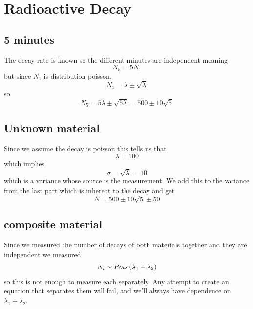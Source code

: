 \clearpage
\section{Radioactive Decay}
\subsection{5 minutes}
The decay rate is known so the different minutes are independent meaning
\begin{equation}
    N_5=5N_1
\end{equation}
but since \(N_1\) is distribution poisson,
\begin{equation}
    N_1=\lambda\pm\sqrt{\lambda}
\end{equation}
so 
\begin{equation}
    N_5 = 5\lambda\pm\sqrt{5\lambda}=500\pm10\sqrt{5}
\end{equation}
\subsection{Unknown material}
Since we assume the decay is poisson this tells us that 
\begin{equation}
    \lambda=100
\end{equation}
which implies 
\begin{equation}
    \sigma = \sqrt{\lambda}=10
\end{equation}
which is a variance whose source is the measurement. We add this to the variance from the last part which is inherent to the decay and get 
\begin{equation}
    N = 500\pm10\sqrt{5}\pm50
\end{equation}
\subsection{composite material}
Since we measured the number of decays of both materials together and they are independent we measured 
\begin{equation}
    N_i\sim Pois\left(\lambda_1+\lambda_2\right)
\end{equation}
so this is not enough to measure each separately. Any attempt to create an equation that separates them will fail, and we'll always have dependence on \(\lambda_1+\lambda_2\).